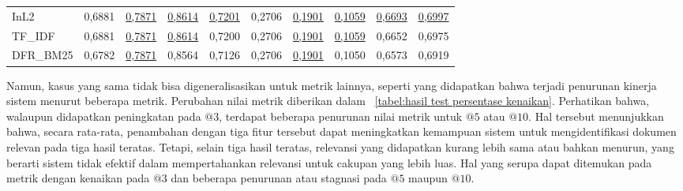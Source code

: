 \begin{table}[H]
{\begin{tabular}{lrrrrrrrrr}
	InL2 & 0,6881 & \underline{0,7871} & \underline{0,8614} & \underline{0,7201} & 0,2706 & \underline{0,1901} & \underline{0,1059} & \underline{0,6693} & \underline{0,6997} \\
	TF\_IDF & 0,6881 & \underline{0,7871} & \underline{0,8614} & 0,7200 & 0,2706 & \underline{0,1901} & \underline{0,1059} & 0,6652 & 0,6975 \\
	DFR\_BM25 & 0,6782 & \underline{0,7871} & 0,8564 & 0,7126 & 0,2706 & \underline{0,1901} & 0,1050 & 0,6573 & 0,6919 \\
	\bottomrule
	\end{tabular}%
    }
\end{table}

Namun, kasus yang sama tidak bisa digeneralisasikan untuk metrik lainnya, seperti yang didapatkan bahwa terjadi penurunan kinerja sistem menurut beberapa metrik. Perubahan nilai metrik diberikan dalam \tabel{}~\ref{tabel:hasil test persentase kenaikan}. Perhatikan bahwa, walaupun didapatkan peningkatan pada \recall{}$@3$, terdapat beberapa penurunan nilai metrik untuk \recall{}$@5$ atau \recall{}$@10$. Hal tersebut menunjukkan bahwa, secara rata-rata, penambahan \reranker{} dengan tiga fitur tersebut dapat meningkatkan kemampuan sistem untuk mengidentifikasi dokumen relevan pada tiga hasil teratas. Tetapi, selain tiga hasil teratas, relevansi yang didapatkan kurang lebih sama atau bahkan menurun, yang berarti sistem tidak efektif dalam mempertahankan relevansi untuk cakupan yang lebih luas. Hal yang serupa dapat ditemukan pada metrik \precision{} dengan kenaikan pada \precision{}$@3$ dan beberapa penurunan atau stagnasi pada \precision{}$@5$ maupun \precision{}$@10$.

